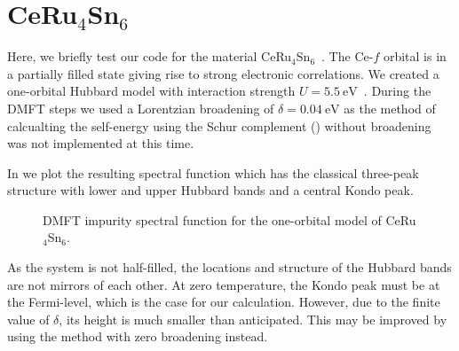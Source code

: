 \section{\texorpdfstring{CeRu$_4$Sn$_6$}{CeRu4Sn6}}

Here, we briefly test our code for the material
CeRu$_4$Sn$_6$~\cite{Sundermann2015, Wissgott2016, Dobilas2025}.
The Ce-$f$ orbital is in a partially filled state giving rise to strong electronic correlations.
We created a one-orbital Hubbard model with
interaction strength $U=\qty{5.5}{\eV}$~\cite{Wissgott2016}.
During the DMFT steps we used a Lorentzian broadening of $\delta=\qty{0.04}{\eV}$
as the method of calcualting the self-energy using
the Schur complement () without broadening was
not implemented at this time.

In  we plot the resulting spectral function
which has the classical three-peak structure with lower and upper Hubbard bands
and a central Kondo peak.
\begin{figure}[ht]
    \centering
    
    \caption{
        DMFT impurity spectral function for the one-orbital model of CeRu$_4$Sn$_6$.
    }%
    \label{fig:spectral-function-CeRu4Sn6}
\end{figure}
As the system is not half-filled,
the locations and structure of the Hubbard bands are not mirrors of each other.
At zero temperature, the Kondo peak must be at the Fermi-level,
which is the case for our calculation.
However,
due to the finite value of $\delta$, its height is much smaller than anticipated.
This may be improved by using the method with zero broadening instead. %
